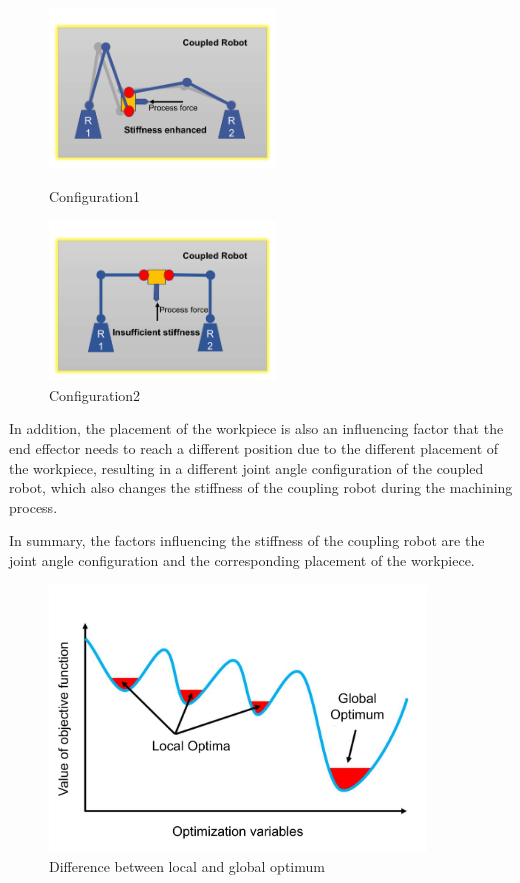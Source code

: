 \begin{figure}[h!]
\centering
\begin{minipage}[t]{0.48\textwidth}
\centering
\includegraphics[width=6cm]{03_images/co_stiff_1.pdf}
\caption{Configuration1}
\label{fig:Introduction:configuration1}
\end{minipage}
\begin{minipage}[t]{0.48\textwidth}
\centering
\includegraphics[width=6cm]{03_images/co_stiff_2.pdf}
\caption{Configuration2}
\label{fig:Introduction:configuration2}
\end{minipage}
\end{figure}
In addition, the placement of the workpiece is also an influencing factor that the end effector needs to reach a different position due to the different placement of the workpiece, resulting in a different joint angle configuration of the coupled robot, which also changes the stiffness of the coupling robot during the machining process.\par
In summary, the factors influencing the stiffness of the coupling robot are the joint angle configuration and the corresponding placement of the workpiece.\par
\begin{figure}[ht!]
	\centering
	\includegraphics[width=10cm]{03_images/local_global.pdf}
	\caption{Difference between local and global optimum}
	\label{fig:Introduction:local_global}
\end{figure}
